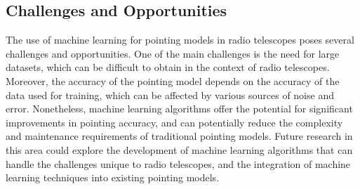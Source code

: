\subsection{Challenges and Opportunities}
The use of machine learning for pointing models in radio telescopes poses several challenges and opportunities.
One of the main challenges is the need for large datasets, which can be difficult to obtain in the context of radio telescopes.
Moreover, the accuracy of the pointing model depends on the accuracy of the data used for training, which can be affected by various sources of noise and error.
Nonetheless, machine learning algorithms offer the potential for significant improvements in pointing accuracy,
and can potentially reduce the complexity and maintenance requirements of traditional pointing models.
Future research in this area could explore the development of machine learning algorithms that can handle the challenges unique to radio telescopes,
and the integration of machine learning techniques into existing pointing models.







